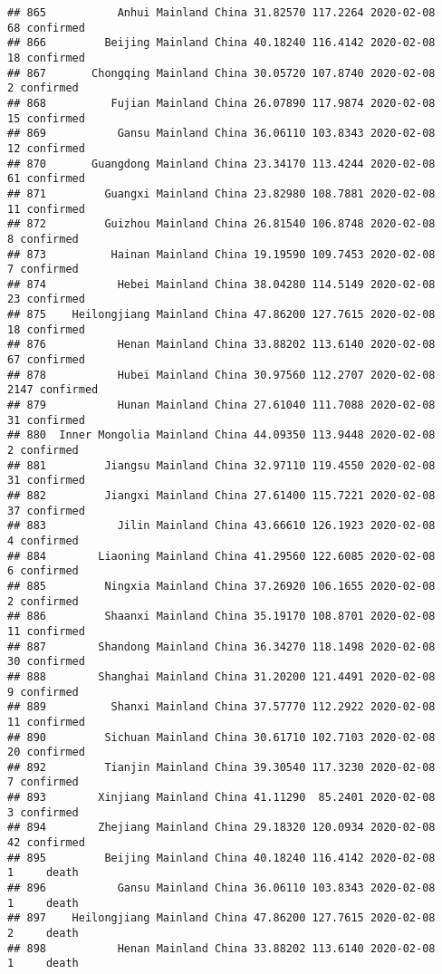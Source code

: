 \documentclass[
]{article}
\begin{document}
\begin{verbatim}
## 865           Anhui Mainland China 31.82570 117.2264 2020-02-08    68 confirmed
## 866         Beijing Mainland China 40.18240 116.4142 2020-02-08    18 confirmed
## 867       Chongqing Mainland China 30.05720 107.8740 2020-02-08     2 confirmed
## 868          Fujian Mainland China 26.07890 117.9874 2020-02-08    15 confirmed
## 869           Gansu Mainland China 36.06110 103.8343 2020-02-08    12 confirmed
## 870       Guangdong Mainland China 23.34170 113.4244 2020-02-08    61 confirmed
## 871         Guangxi Mainland China 23.82980 108.7881 2020-02-08    11 confirmed
## 872         Guizhou Mainland China 26.81540 106.8748 2020-02-08     8 confirmed
## 873          Hainan Mainland China 19.19590 109.7453 2020-02-08     7 confirmed
## 874           Hebei Mainland China 38.04280 114.5149 2020-02-08    23 confirmed
## 875    Heilongjiang Mainland China 47.86200 127.7615 2020-02-08    18 confirmed
## 876           Henan Mainland China 33.88202 113.6140 2020-02-08    67 confirmed
## 878           Hubei Mainland China 30.97560 112.2707 2020-02-08  2147 confirmed
## 879           Hunan Mainland China 27.61040 111.7088 2020-02-08    31 confirmed
## 880  Inner Mongolia Mainland China 44.09350 113.9448 2020-02-08     2 confirmed
## 881         Jiangsu Mainland China 32.97110 119.4550 2020-02-08    31 confirmed
## 882         Jiangxi Mainland China 27.61400 115.7221 2020-02-08    37 confirmed
## 883           Jilin Mainland China 43.66610 126.1923 2020-02-08     4 confirmed
## 884        Liaoning Mainland China 41.29560 122.6085 2020-02-08     6 confirmed
## 885         Ningxia Mainland China 37.26920 106.1655 2020-02-08     2 confirmed
## 886         Shaanxi Mainland China 35.19170 108.8701 2020-02-08    11 confirmed
## 887        Shandong Mainland China 36.34270 118.1498 2020-02-08    30 confirmed
## 888        Shanghai Mainland China 31.20200 121.4491 2020-02-08     9 confirmed
## 889          Shanxi Mainland China 37.57770 112.2922 2020-02-08    11 confirmed
## 890         Sichuan Mainland China 30.61710 102.7103 2020-02-08    20 confirmed
## 892         Tianjin Mainland China 39.30540 117.3230 2020-02-08     7 confirmed
## 893        Xinjiang Mainland China 41.11290  85.2401 2020-02-08     3 confirmed
## 894        Zhejiang Mainland China 29.18320 120.0934 2020-02-08    42 confirmed
## 895         Beijing Mainland China 40.18240 116.4142 2020-02-08     1     death
## 896           Gansu Mainland China 36.06110 103.8343 2020-02-08     1     death
## 897    Heilongjiang Mainland China 47.86200 127.7615 2020-02-08     2     death
## 898           Henan Mainland China 33.88202 113.6140 2020-02-08     1     death

\end{verbatim}
\end{document}
